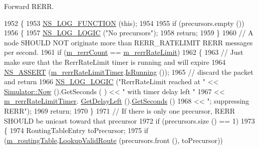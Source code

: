 Forward R\+E\+RR. 


\begin{DoxyCode}
1952 \{
1953   \hyperlink{log-macros-disabled_8h_a90b90d5bad1f39cb1b64923ea94c0761}{NS\_LOG\_FUNCTION} (\textcolor{keyword}{this});
1954 
1955   \textcolor{keywordflow}{if} (precursors.empty ())
1956     \{
1957       \hyperlink{group__logging_ga88acd260151caf2db9c0fc84997f45ce}{NS\_LOG\_LOGIC} (\textcolor{stringliteral}{"No precursors"});
1958       \textcolor{keywordflow}{return};
1959     \}
1960   \textcolor{comment}{// A node SHOULD NOT originate more than RERR\_RATELIMIT RERR messages per second.}
1961   \textcolor{keywordflow}{if} (\hyperlink{classns3_1_1aodv_1_1RoutingProtocol_a4afc71535ffd2ea1bd7dcb03e3fd4233}{m\_rerrCount} == \hyperlink{classns3_1_1aodv_1_1RoutingProtocol_ad7a69761e61bcea41a2bc87ad8928e2d}{m\_rerrRateLimit})
1962     \{
1963       \textcolor{comment}{// Just make sure that the RerrRateLimit timer is running and will expire}
1964       \hyperlink{assert_8h_a6dccdb0de9b252f60088ce281c49d052}{NS\_ASSERT} (\hyperlink{classns3_1_1aodv_1_1RoutingProtocol_a0eaa679b6dea15e92c550591eabbccc1}{m\_rerrRateLimitTimer}.\hyperlink{classns3_1_1Timer_addbc6c740f21ddeb6ad358557962b24c}{IsRunning} ());
1965       \textcolor{comment}{// discard the packet and return}
1966       \hyperlink{group__logging_ga88acd260151caf2db9c0fc84997f45ce}{NS\_LOG\_LOGIC} (\textcolor{stringliteral}{"RerrRateLimit reached at "} << \hyperlink{classns3_1_1Simulator_ac3178fa975b419f7875e7105be122800}{Simulator::Now} ().GetSeconds (
      ) << \textcolor{stringliteral}{" with timer delay left "} 
1967                                                 << \hyperlink{classns3_1_1aodv_1_1RoutingProtocol_a0eaa679b6dea15e92c550591eabbccc1}{m\_rerrRateLimitTimer}.
      \hyperlink{classns3_1_1Timer_a0dc288dd3de21a524d088fc8a5a14a73}{GetDelayLeft} ().\hyperlink{classns3_1_1Time_a8f20d5c3b0902d7b4320982f340b57c8}{GetSeconds} ()
1968                                                 << \textcolor{stringliteral}{"; suppressing RERR"});
1969       \textcolor{keywordflow}{return};
1970     \}
1971   \textcolor{comment}{// If there is only one precursor, RERR SHOULD be unicast toward that precursor}
1972   \textcolor{keywordflow}{if} (precursors.size () == 1)
1973     \{
1974       RoutingTableEntry toPrecursor;
1975       \textcolor{keywordflow}{if} (\hyperlink{classns3_1_1aodv_1_1RoutingProtocol_a4e1003a34c8adc96db71096d88c98ae0}{m\_routingTable}.\hyperlink{classns3_1_1aodv_1_1RoutingTable_a2ca8c3757223d681d4cc39e2028fa7ad}{LookupValidRoute} (precursors.front (), toPrecursor))

\end{DoxyCode}
